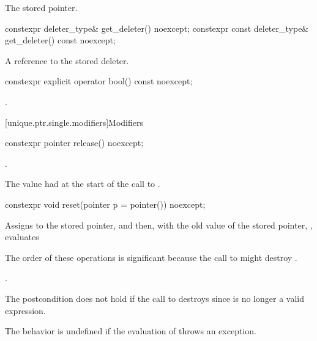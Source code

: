 \begin{itemdescr}
\pnum
\returns
The stored pointer.
\end{itemdescr}

%
\begin{itemdecl}
constexpr deleter_type& get_deleter() noexcept;
constexpr const deleter_type& get_deleter() const noexcept;
\end{itemdecl}

\begin{itemdescr}
\pnum
\returns
A reference to the stored deleter.
\end{itemdescr}

%
\begin{itemdecl}
constexpr explicit operator bool() const noexcept;
\end{itemdecl}

\begin{itemdescr}
\pnum
\returns
{}.
\end{itemdescr}

[unique.ptr.single.modifiers]{Modifiers}

%
\begin{itemdecl}
constexpr pointer release() noexcept;
\end{itemdecl}

\begin{itemdescr}
\pnum
\ensures
{}.

\pnum
\returns
The value  had at the start of
the call to .
\end{itemdescr}

%
\begin{itemdecl}
constexpr void reset(pointer p = pointer()) noexcept;
\end{itemdecl}

\begin{itemdescr}
\pnum
\effects
Assigns  to the stored pointer, and then,
with the old value of the stored pointer, ,
evaluates 
\begin{note}
The order of these operations is significant
because the call to  might destroy .
\end{note}

\pnum
\ensures
{}.
\begin{note}
The postcondition does not hold if the call to 
destroys  since  is no longer a valid expression.
\end{note}

\pnum
\remarks
The behavior is undefined
if the evaluation of  throws an exception.
\end{itemdescr}

